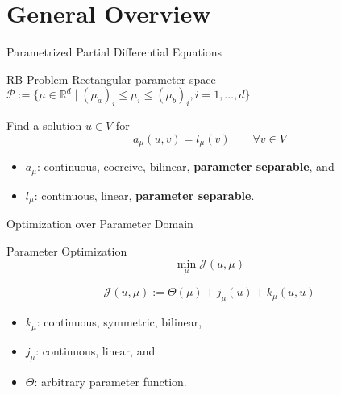 \section{General Overview}

\begin{frame}{Parametrized Partial Differential Equations}
    \begin{block}{RB Problem}
        Rectangular parameter space $\mathcal{P} := \{ \mu \in \mathbb{R}^d \; | \; {(\mu_a)}_i \leq \mu_i \leq {(\mu_b)}_i, i = 1, \dots, d \}$

        Find a solution $u \in V$ for
        \begin{equation*}
            a_\mu(u, v) = l_\mu(v) \qquad \forall v \in V
        \end{equation*}
    \end{block}
    \begin{itemize}
        \item $a_\mu$: continuous, coercive, bilinear, \textbf{parameter separable}, and
        \item $l_\mu$: continuous, linear, \textbf{parameter separable}.   
    \end{itemize}
\end{frame}

\begin{frame}{Optimization over Parameter Domain}
    \begin{block}{Parameter Optimization}
        \[ \min\limits_{\mu} \mathcal{J}(u, \mu) \]
    \end{block}
    \[ \mathcal{J}(u, \mu) := \Theta(\mu) + j_\mu(u) + k_\mu(u, u) \]
    \begin{itemize}
        \item $k_\mu$: continuous, symmetric, bilinear,
        \item $j_\mu$: continuous, linear, and
        \item $\Theta$: arbitrary parameter function.
    \end{itemize}
\end{frame}

